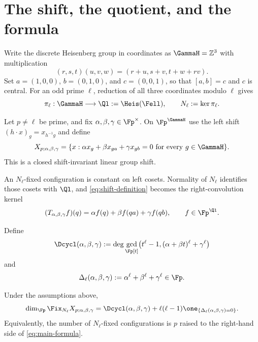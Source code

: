 \section{The shift, the quotient, and the formula}

Write the discrete Heisenberg group in coordinates as $\GammaH=\mathbb Z^3$
with multiplication
\begin{equation}\label{eq:heis-product}
 (r,s,t)(u,v,w)=(r+u,s+v,t+w+rv).
\end{equation}
Set $a=(1,0,0)$, $b=(0,1,0)$, and $c=(0,0,1)$, so that
$[a,b]=c$ and $c$ is central.  For an odd prime $\ell$, reduction of all
three coordinates modulo $\ell$ gives
\[
 \pi_\ell:\GammaH\longrightarrow
 \Ql:=\Heis(\Fell),
 \qquad N_\ell:=\ker\pi_\ell.
\]

Let $p\ne\ell$ be prime, and fix
$\alpha,\beta,\gamma\in\Fp^\times$.  On $\Fp^{\GammaH}$ use the left shift
$(h\cdot x)_g=x_{h^{-1}g}$ and define
\begin{equation}\label{eq:shift-definition}
 X_{p;\alpha,\beta,\gamma}
 =\{x:\alpha x_g+\beta x_{ga}+\gamma x_{gb}=0
       \text{ for every }g\in\GammaH\}.
\end{equation}
This is a closed shift-invariant linear group shift.

An $N_\ell$-fixed configuration is constant on left cosets.  Normality of
$N_\ell$ identifies those cosets with $\Ql$, and \eqref{eq:shift-definition}
becomes the right-convolution kernel
\begin{equation}\label{eq:finite-operator}
 (T_{\alpha,\beta,\gamma}f)(q)
  =\alpha f(q)+\beta f(qa)+\gamma f(qb),
 \qquad f\in\Fp^{\Ql}.
\end{equation}

Define
\begin{equation}\label{eq:D-definition}
 \Dcycl(\alpha,\beta,\gamma)
 :=\deg\gcd_{\Fp[t]}
 \bigl(t^\ell-1,(\alpha+\beta t)^\ell+\gamma^\ell\bigr)
\end{equation}
and
\begin{equation}\label{eq:Fermat-delta}
 \Delta_\ell(\alpha,\beta,\gamma)
 :=\alpha^\ell+\beta^\ell+\gamma^\ell\in\Fp.
\end{equation}

\begin{theorem}\label{thm:main}
Under the assumptions above,
\begin{equation}\label{eq:main-formula}
 \dim_{\Fp}\Fix_{N_\ell}
 X_{p;\alpha,\beta,\gamma}
 =\Dcycl(\alpha,\beta,\gamma)
  +\ell(\ell-1)\one_{\{\Delta_\ell(\alpha,\beta,\gamma)=0\}}.
\end{equation}
Equivalently, the number of $N_\ell$-fixed configurations is $p$ raised to
the right-hand side of \eqref{eq:main-formula}.
\end{theorem}

